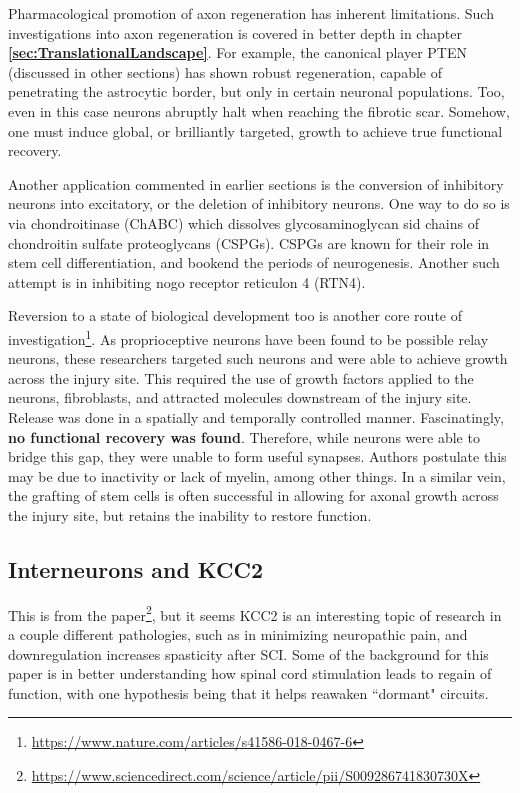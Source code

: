 Pharmacological promotion of axon regeneration has inherent limitations. Such investigations into axon regeneration is covered in better depth in chapter \textbf{\ref{sec:TranslationalLandscape}}. For example, the canonical player PTEN (discussed in other sections) has shown robust regeneration, capable of penetrating the astrocytic border, but only in certain neuronal populations. Too, even in this case neurons abruptly halt when reaching the fibrotic scar. Somehow, one must induce global, or brilliantly targeted, growth to achieve true functional recovery. \newline

Another application commented in earlier sections is the conversion of inhibitory neurons into excitatory, or the deletion of inhibitory neurons. One way to do so is via chondroitinase (ChABC) which dissolves glycosaminoglycan sid chains of chondroitin sulfate proteoglycans (CSPGs). CSPGs are known for their role in stem cell differentiation, and bookend the periods of neurogenesis. Another such attempt is in inhibiting nogo receptor reticulon 4 (RTN4). \newline

Reversion to a state of biological development too is another core route of investigation\footnote{\url{https://www.nature.com/articles/s41586-018-0467-6}}. As proprioceptive neurons have been found to be possible relay neurons, these researchers targeted such neurons and were able to achieve growth across the injury site. This required the use of growth factors applied to the neurons, fibroblasts, and attracted molecules downstream of the injury site. Release was done in a spatially and temporally controlled manner. Fascinatingly, \textbf{no functional recovery was found}. Therefore, while neurons were able to bridge this gap, they were unable to form useful synapses. Authors postulate this may be due to inactivity or lack of myelin, among other things. In a similar vein, the grafting of stem cells is often successful in allowing for axonal growth across the injury site, but retains the inability to restore function.\newline

\subsection{Interneurons and KCC2}
\label{sec:KCC2}

This is from the paper\footnote{\url{https://www.sciencedirect.com/science/article/pii/S009286741830730X}}, but it seems KCC2 is an interesting topic of research in a couple different pathologies, such as in minimizing neuropathic pain, and downregulation increases spasticity after SCI. Some of the background for this paper is in better understanding how spinal cord stimulation leads to regain of function, with one hypothesis being that it helps reawaken ``dormant" circuits.\newline

